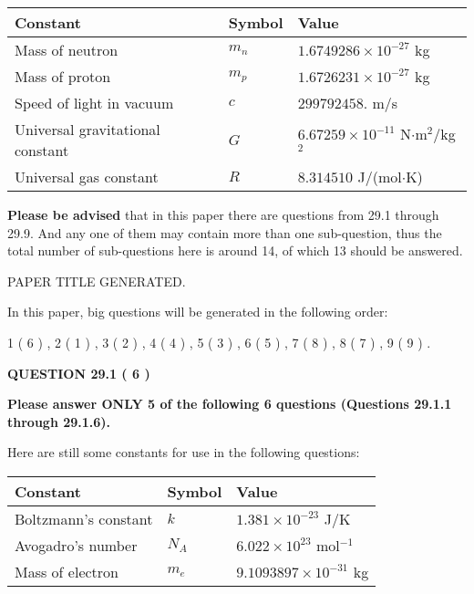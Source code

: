 \documentclass[12pt]{article}
\begin{document}
 
\noindent\begin{tabular}{|l|l|l|}
\hline
Constant & Symbol & Value \\
\hline
Mass of neutron &
$m_n$ &
 $ 1.6749286 \times 10^{-27} $
kg \\
\hline
Mass of proton &
$m_p$ &
 $ 1.6726231 \times 10^{-27} $
kg \\
\hline
Speed of light in vacuum &
$c$ &
 $ 299792458. $
m/s \\
\hline
Universal gravitational constant &
$G$ &
 $ 6.67259 \times 10^{-11} $
N$\cdot $m$^2$/kg$^2$ \\
\hline
Universal gas constant &
$R$ &
 $ 8.314510 $
J/(mol$\cdot $K) \\
\hline
\end{tabular}
 
 
{\textbf{\large{Please be advised}}} that in this paper there are questions from
29.1 through
29.9.
And any one of them may contain more than one sub-question, thus the total number
of sub-questions here is around 14, of which
13 should be answered.
 
\vspace{0.3in}
 
 
   
   
 PAPER TITLE GENERATED.
   
   
   
\vspace{0.2in}
   
In this paper, big questions will be generated in the following order: 
   
   
             1 (           6 )
 ,
             2 (           1 )
 ,
             3 (           2 )
 ,
             4 (           4 )
 ,
             5 (           3 )
 ,
             6 (           5 )
 ,
             7 (           8 )
 ,
             8 (           7 )
 ,
             9 (           9 )
 .
  
\vspace{0.2in}
  
{\textbf{\Large{QUESTION
29.1 
 (           6 )
}}}
  
  
 
{\textbf{\Large{Please answer ONLY
5 of the following
6 questions (Questions
29.1.1 through
29.1.6). }}}
 
Here are still some constants for use in the following questions:
 
 
\noindent\begin{tabular}{|l|l|l|}
\hline
Constant & Symbol & Value \\
\hline
 
Boltzmann's constant &
$k$ &
 $ 1.381 \times 10^{-23} $
J/K \\
\hline
 
Avogadro's number &
$N_A$ &
 $ 6.022 \times 10^{23} $
mol$^{-1}$ \\
\hline
 
Mass of electron &
$m_e$ &
 $ 9.1093897 \times 10^{-31} $
kg \\
\hline
 
\end{tabular}
 
\end{document}
